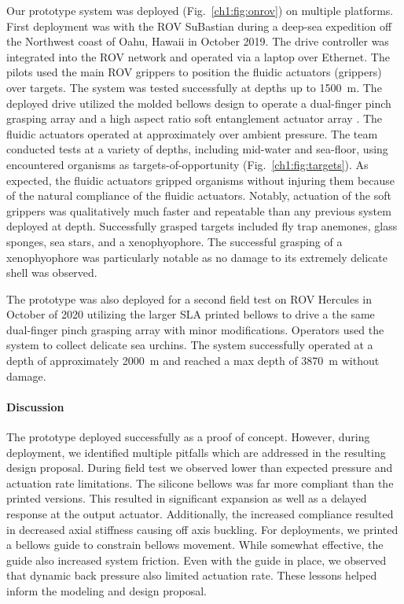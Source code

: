 Our prototype system was deployed (Fig.~\ref{ch1:fig:onrov}) on multiple
platforms. First deployment was with the \gls{ROV} SuBastian during a deep-sea
expedition off the Northwest coast of Oahu, Hawaii in October 2019. The
drive controller was integrated into the \gls{ROV} network and operated via a
laptop over Ethernet. The pilots used the main \gls{ROV} grippers to position
the fluidic actuators (grippers) over targets. The system was tested
successfully at depths up to \SI{1500}{\meter}. The deployed drive utilized
the molded bellows design to operate a dual-finger pinch grasping array \cite{teeple2020multi}
and a high aspect ratio soft entanglement actuator array \cite{becker2020mechanically}. 
The fluidic actuators operated at approximately  over ambient pressure. 
The team conducted tests at a variety of depths, including mid-water and
sea-floor, using encountered organisms as targets-of-opportunity
(Fig.~\ref{ch1:fig:targets}). As expected, the fluidic actuators gripped
organisms without injuring them because of the natural compliance of the
fluidic actuators. Notably, actuation of the soft grippers was
qualitatively much faster and repeatable than any previous system
deployed at depth. Successfully grasped targets included fly trap
anemones, glass sponges, sea stars, and a xenophyophore. The successful
grasping of a xenophyophore was particularly notable as no damage
to its extremely delicate shell was observed.

The prototype was also deployed for a second field test on \gls{ROV} Hercules
in October of 2020 utilizing the larger \gls{SLA} printed bellows to drive a
the same dual-finger pinch grasping array with minor modifications. Operators
used the system to collect delicate sea urchins. The system successfully
operated at a depth of approximately \SI{2000}{\meter} and reached a max depth of \SI{3870}{\meter} without damage.

\hypertarget{ch1:discussion}{%
\paragraph{Discussion}\label{ch1:field-discussion}}

The prototype deployed successfully as a proof of concept. However,
during deployment, we identified multiple pitfalls which are addressed
in the resulting design proposal. During field test we observed 
lower than expected pressure and actuation rate limitations.
The silicone bellows was far more compliant than the printed
versions. This resulted in significant expansion as well as a delayed
response at the output actuator. Additionally, the increased compliance
resulted in decreased axial stiffness causing off axis buckling. For
deployments, we printed a bellows guide to constrain bellows movement.
While somewhat effective, the guide also increased system friction. Even
with the guide in place, we observed that dynamic back pressure also limited
actuation rate. These lessons helped inform the modeling and design
proposal.


